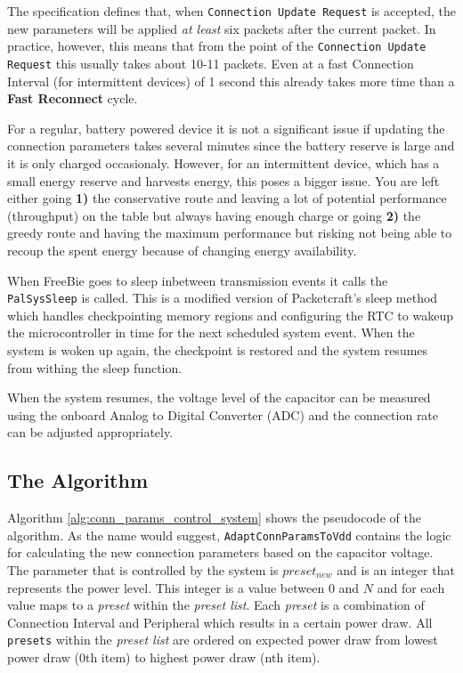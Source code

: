The specification defines that, when \texttt{Connection Update Request} is accepted, the new parameters will be applied \textit{at least} six packets after the current packet. In practice, however, this means that from the point of the \texttt{Connection Update Request} this usually takes about 10-11 packets. Even at a fast Connection Interval (for intermittent devices) of 1 second this already takes more time than a \textbf{Fast Reconnect} cycle. 

For a regular, battery powered device it is not a significant issue if updating the connection parameters takes several minutes since the battery reserve is large and it is only charged occasionaly. However, for an intermittent device, which has a small energy reserve and harvests energy, this poses a bigger issue. You are left either going \textbf{1)} the conservative route and leaving a lot of potential performance (throughput) on the table but always having enough charge or going \textbf{2)} the greedy route and having the maximum performance but risking not being able to recoup the spent energy because of changing energy availability.

When FreeBie goes to sleep inbetween transmission events it calls the \texttt{PalSysSleep} is called. This is a modified version of Packetcraft's sleep method which handles checkpointing memory regions and configuring the RTC to wakeup the microcontroller in time for the next scheduled system event. When the system is woken up again, the checkpoint is restored and the system resumes from withing the sleep function. 

When the system resumes, the voltage level of the capacitor can be measured using the onboard Analog to Digital Converter (ADC) and the connection rate can be adjusted appropriately. 

\subsection{The Algorithm}
Algorithm \ref{alg:conn_params_control_system} shows the pseudocode of the algorithm. As the name would suggest, \texttt{AdaptConnParamsToVdd} contains the logic for calculating the new connection parameters based on the capacitor voltage. The parameter that is controlled by the system is $preset_{new}$ and is an integer that represents the power level. This integer is a value between $0$ and $N$ and for each value maps to a \textit{preset} within the \textit{preset list}. Each \textit{preset} is a combination of Connection Interval and Peripheral which results in a certain power draw. All \texttt{presets} within the \textit{preset list} are ordered on expected power draw from lowest power draw (0th item) to highest power draw (nth item).

